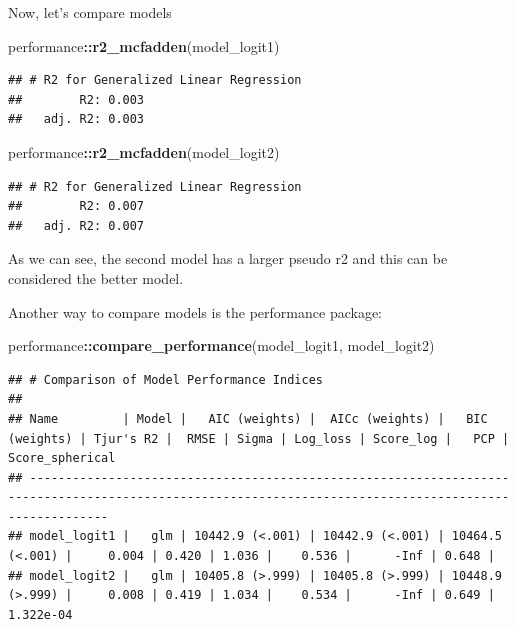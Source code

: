 \documentclass[
]{book}
\newenvironment{Shaded}{\begin{snugshade}}{\end{snugshade}}
\newcommand{\FunctionTok}[1]{\textcolor[rgb]{0.13,0.29,0.53}{\textbf{#1}}}
\newcommand{\NormalTok}[1]{#1}
\newcommand{\SpecialCharTok}[1]{\textcolor[rgb]{0.81,0.36,0.00}{\textbf{#1}}}
\begin{document}
Now, let's compare models

\begin{Shaded}
\begin{Highlighting}[]
\NormalTok{performance}\SpecialCharTok{::}\FunctionTok{r2\_mcfadden}\NormalTok{(model\_logit1)}
\end{Highlighting}
\end{Shaded}

\begin{verbatim}
## # R2 for Generalized Linear Regression
##        R2: 0.003
##   adj. R2: 0.003
\end{verbatim}

\begin{Shaded}
\begin{Highlighting}[]
\NormalTok{performance}\SpecialCharTok{::}\FunctionTok{r2\_mcfadden}\NormalTok{(model\_logit2)}
\end{Highlighting}
\end{Shaded}

\begin{verbatim}
## # R2 for Generalized Linear Regression
##        R2: 0.007
##   adj. R2: 0.007
\end{verbatim}

As we can see, the second model has a larger pseudo r2 and this can be considered the better model.

Another way to compare models is the performance package:

\begin{Shaded}
\begin{Highlighting}[]
\NormalTok{performance}\SpecialCharTok{::}\FunctionTok{compare\_performance}\NormalTok{(model\_logit1, model\_logit2)}
\end{Highlighting}
\end{Shaded}

\begin{verbatim}
## # Comparison of Model Performance Indices
## 
## Name         | Model |   AIC (weights) |  AICc (weights) |   BIC (weights) | Tjur's R2 |  RMSE | Sigma | Log_loss | Score_log |   PCP | Score_spherical
## -------------------------------------------------------------------------------------------------------------------------------------------------------
## model_logit1 |   glm | 10442.9 (<.001) | 10442.9 (<.001) | 10464.5 (<.001) |     0.004 | 0.420 | 1.036 |    0.536 |      -Inf | 0.648 |                
## model_logit2 |   glm | 10405.8 (>.999) | 10405.8 (>.999) | 10448.9 (>.999) |     0.008 | 0.419 | 1.034 |    0.534 |      -Inf | 0.649 |       1.322e-04
\end{verbatim}
\end{document}
